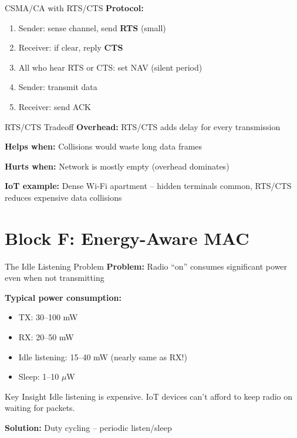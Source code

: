 \documentclass[aspectratio=169,11pt]{beamer}
\begin{document}
\begin{frame}{CSMA/CA with RTS/CTS}
    \textbf{Protocol:}
    \begin{enumerate}
        \item Sender: sense channel, send \textbf{RTS} (small)
        \item Receiver: if clear, reply \textbf{CTS}
        \item All who hear RTS or CTS: set NAV (silent period)
        \item Sender: transmit data
        \item Receiver: send ACK
    \end{enumerate}
    
    \vspace{0.3cm}
    \begin{alertblock}{RTS/CTS Tradeoff}
        \textbf{Overhead:} RTS/CTS adds delay for every transmission
        
        \textbf{Helps when:} Collisions would waste long data frames
        
        \textbf{Hurts when:} Network is mostly empty (overhead dominates)
    \end{alertblock}
    
    \textbf{IoT example:} Dense Wi-Fi apartment -- hidden terminals common, RTS/CTS reduces expensive data collisions
\end{frame}

\section{Block F: Energy-Aware MAC}

\begin{frame}{The Idle Listening Problem}
    \textbf{Problem:} Radio ``on'' consumes significant power even when not transmitting
    
    \vspace{0.3cm}
    \textbf{Typical power consumption:}
    \begin{itemize}
        \item TX: 30--100 mW
        \item RX: 20--50 mW
        \item Idle listening: 15--40 mW (nearly same as RX!)
        \item Sleep: 1--10 $\mu$W
    \end{itemize}
    
    \begin{alertblock}{Key Insight}
        Idle listening is expensive. IoT devices can't afford to keep radio on waiting for packets.
    \end{alertblock}
    
    \textbf{Solution:} Duty cycling -- periodic listen/sleep
\end{frame}
\end{document}
